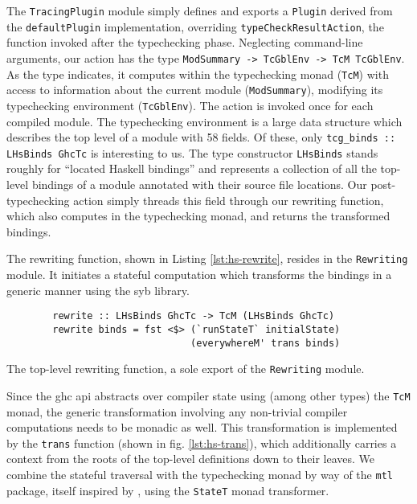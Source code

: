 \documentclass[thesis=B,english]{FITthesis}[2019/12/23]
\newcommand{\hackage}[1]{\texttt{#1}}
\newcommand{\hsType}[1]{\texttt{#1}}
\newcommand{\hsIdent}[1]{\texttt{#1}}
\newcommand{\hsModule}[1]{\texttt{#1}}
\newcommand{\hsCode}[1]{\texttt{#1}}
\begin{document}
The \hsModule{TracingPlugin} module simply defines and exports a
\hsType{Plugin} derived from the \hsIdent{defaultPlugin} implementation,
overriding \hsIdent{typeCheckResultAction}, the function invoked after the
typechecking phase. Neglecting command-line arguments, our action has the type
\hsType{ModSummary -> TcGblEnv -> TcM TcGblEnv}. As the type indicates, it
computes within the typechecking monad (\hsType{TcM}) with access to
information about the current module (\hsType{ModSummary}), modifying its
typechecking environment (\hsType{TcGblEnv}). The action is invoked once for
each compiled module. The typechecking environment is a large data structure
which describes the top level of a module with 58 fields. Of these, only
\hsCode{tcg_binds :: LHsBinds GhcTc} is interesting to us. The type
constructor \hsType{LHsBinds} stands roughly for ``located Haskell bindings''
and represents a collection of all the top-level bindings of a module annotated
with their source file locations. Our post-typechecking action simply threads
this field through our rewriting function, which also computes in the
typechecking monad, and returns the transformed bindings.

The rewriting function, shown in Listing \ref{lst:hs-rewrite}, resides in the
\hsModule{Rewriting} module. It initiates a stateful computation which
transforms the bindings in a generic manner using the \acrshort{syb} library.
\begin{listing}[h]
	\centering
	\begin{verbatim}
        rewrite :: LHsBinds GhcTc -> TcM (LHsBinds GhcTc)
        rewrite binds = fst <$> (`runStateT` initialState)
                                (everywhereM' trans binds)
	\end{verbatim}
	\caption[The top-level rewriting function.]{The top-level rewriting
	function, a sole export of the \hsModule{Rewriting} module.}
	\label{lst:hs-rewrite}
\end{listing}

Since the \acrshort{ghc} \acrshort{api} abstracts over compiler state using
(among other types) the \hsType{TcM} monad, the generic transformation
involving any non-trivial compiler computations needs to be monadic as well.
This transformation is implemented by the \hsIdent{trans} function (shown in
fig. \ref{lst:hs-trans}), which additionally carries a context from the roots
of the top-level definitions down to their leaves. We combine the stateful
traversal with the typechecking monad by way of the \hackage{mtl} package,
itself inspired by \cite{higher-order-polymorphism}, using the \hsType{StateT}
monad transformer.
\end{document}
